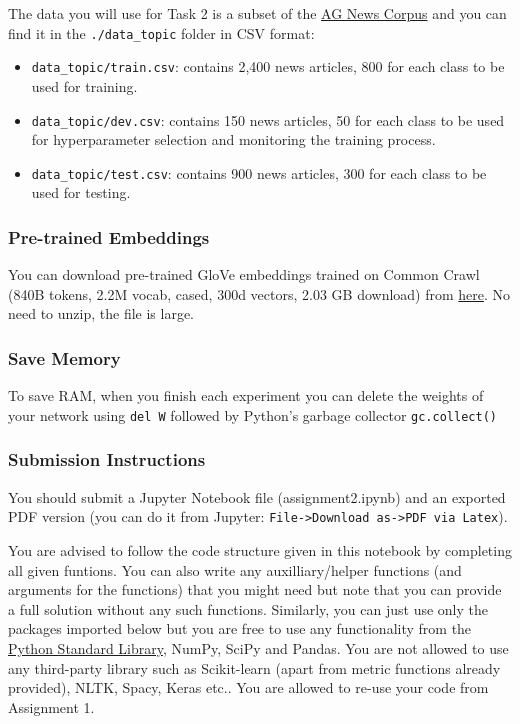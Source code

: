 \documentclass[11pt]{article}
\providecommand{\tightlist}{%
      \setlength{\itemsep}{0pt}\setlength{\parskip}{0pt}}
\begin{document}
The data you will use for Task 2 is a subset of the
\href{http://groups.di.unipi.it/~gulli/AG_corpus_of_news_articles.html}{AG
News Corpus} and you can find it in the \texttt{./data\_topic} folder in
CSV format:

\begin{itemize}
\tightlist
\item
  \texttt{data\_topic/train.csv}: contains 2,400 news articles, 800 for
  each class to be used for training.
\item
  \texttt{data\_topic/dev.csv}: contains 150 news articles, 50 for each
  class to be used for hyperparameter selection and monitoring the
  training process.
\item
  \texttt{data\_topic/test.csv}: contains 900 news articles, 300 for
  each class to be used for testing.
\end{itemize}

\hypertarget{pre-trained-embeddings}{%
\subsubsection{Pre-trained Embeddings}\label{pre-trained-embeddings}}

You can download pre-trained GloVe embeddings trained on Common Crawl
(840B tokens, 2.2M vocab, cased, 300d vectors, 2.03 GB download) from
\href{http://nlp.stanford.edu/data/glove.840B.300d.zip}{here}. No need
to unzip, the file is large.

\hypertarget{save-memory}{%
\subsubsection{Save Memory}\label{save-memory}}

To save RAM, when you finish each experiment you can delete the weights
of your network using \texttt{del\ W} followed by Python's garbage
collector \texttt{gc.collect()}

\hypertarget{submission-instructions}{%
\subsubsection{Submission Instructions}\label{submission-instructions}}

You should submit a Jupyter Notebook file (assignment2.ipynb) and an
exported PDF version (you can do it from Jupyter:
\texttt{File-\textgreater{}Download\ as-\textgreater{}PDF\ via\ Latex}).

You are advised to follow the code structure given in this notebook by
completing all given funtions. You can also write any auxilliary/helper
functions (and arguments for the functions) that you might need but note
that you can provide a full solution without any such functions.
Similarly, you can just use only the packages imported below but you are
free to use any functionality from the
\href{https://docs.python.org/2/library/index.html}{Python Standard
Library}, NumPy, SciPy and Pandas. You are not allowed to use any
third-party library such as Scikit-learn (apart from metric functions
already provided), NLTK, Spacy, Keras etc.. You are allowed to re-use
your code from Assignment 1.
\end{document}
